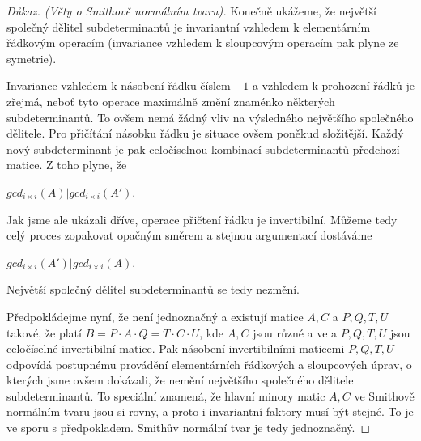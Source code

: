 \begin{proof}[Důkaz. (Věty o Smithově normálním tvaru)]
Konečně ukážeme, že největší společný dělitel subdeterminantů je invariantní
vzhledem k elementárním řádkovým operacím (invariance vzhledem k sloupcovým
operacím pak plyne ze symetrie).

Invariance vzhledem k násobení řádku číslem $ -1 $ a vzhledem k prohození řádků
je zřejmá, neboť tyto operace maximálně změní znaménko některých subdeterminantů.
To ovšem nemá žádný vliv na výsledného největšího společného dělitele. Pro přičítání
násobku řádku je situace ovšem poněkud složitější. Každý nový subdeterminant je
pak celočíselnou kombinací subdeterminantů předchozí matice. Z toho plyne, že
\begin{center}
$ gcd_{i \times i }(A) \vert gcd_{i \times i }(A') $.
\end{center}

Jak jsme ale ukázali dříve, operace přičtení řádku je invertibilní. Můžeme tedy
celý proces zopakovat opačným směrem a stejnou argumentací dostáváme
\begin{center}
$ gcd_{i \times i }(A') \vert gcd_{i \times i }(A) $.
\end{center}
Největší společný dělitel subdeterminantů se tedy nezmění.

Předpokládejme nyní, že \snf{} není jednoznačný a existují matice $ A,C $ a $ P,Q,T,U$
takové, že platí $ B = P \cdot A \cdot Q = T \cdot C \cdot U $, kde $ A,C $ jsou
různé a ve \snf{} a $ P,Q,T,U$ jsou celočíselné invertibilní matice. Pak násobení
invertibilními maticemi $ P,Q,T,U$ odpovídá postupnému provádění elementárních
řádkových a sloupcových úprav, o kterých jsme ovšem dokázali, že nemění největšího
společného dělitele subdeterminantů. To speciální znamená, že hlavní minory matic
$ A,C $ ve Smithově normálním tvaru jsou si rovny, a proto i invariantní faktory
musí být stejné. To je ve sporu s předpokladem. Smithův normální tvar je tedy
jednoznačný.

\end{proof}